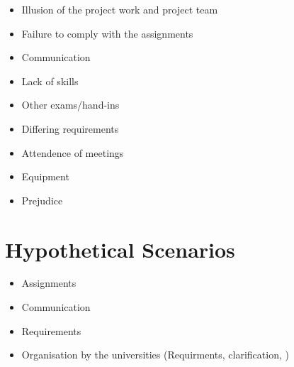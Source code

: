 	\begin{itemize}

		\item Illusion of the project work and project team
		\item Failure to comply with the assignments
		\item Communication
		\item Lack of skills
		\item Other exams/hand-ins
		\item Differing requirements
		\item Attendence of meetings
		\item Equipment
		\item Prejudice
	\end{itemize}


\section{Hypothetical Scenarios}

	\begin{itemize}

		\item Assignments
		\item Communication
		\item Requirements
		\item Organisation by the universities (Requirments, clarification, )
	\end{itemize}
